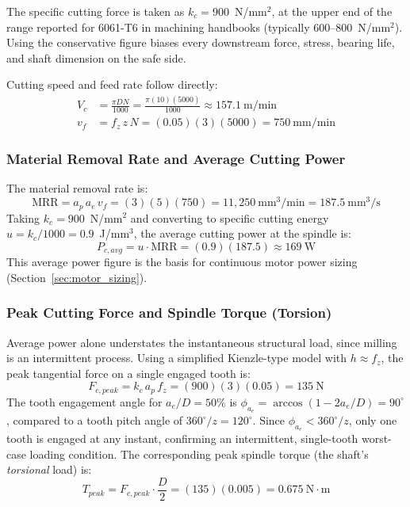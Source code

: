 \documentclass[12pt,a4paper]{report}
\begin{document}
	The specific cutting force is taken as $k_c = 900$~N/mm$^2$, at the upper end of the
	range reported for 6061-T6 in machining handbooks (typically 600--800~N/mm$^2$). Using
	the conservative figure biases every downstream force, stress, bearing life, and shaft
	dimension on the safe side.
	
	Cutting speed and feed rate follow directly:
	\begin{align}
		V_c &= \frac{\pi D N}{1000} = \frac{\pi (10)(5000)}{1000} \approx 157.1~\text{m/min} \\
		v_f &= f_z \, z \, N = (0.05)(3)(5000) = 750~\text{mm/min}
	\end{align}
	
	\subsubsection{Material Removal Rate and Average Cutting Power}\label{sec:mrr_power}
	The material removal rate is:
	\begin{equation}
		\text{MRR} = a_p \, a_e \, v_f = (3)(5)(750) = 11{,}250~\text{mm}^3\text{/min} = 187.5~\text{mm}^3\text{/s}
	\end{equation}
	Taking $k_c = 900$~N/mm$^2$ and converting to specific cutting energy
	$u = k_c / 1000 = 0.9$~J/mm$^3$, the average cutting power at the spindle is:
	\begin{equation}
		P_{c,avg} = u \cdot \text{MRR} = (0.9)(187.5) \approx 169~\text{W}
	\end{equation}
	This average power figure is the basis for continuous motor power sizing (Section~\ref{sec:motor_sizing}).
	
	\subsubsection{Peak Cutting Force and Spindle Torque (Torsion)}\label{sec:peak_force_torque}
	Average power alone understates the instantaneous structural load, since milling is an
	intermittent process. Using a simplified Kienzle-type model with $h \approx f_z$, the peak
	tangential force on a single engaged tooth is:
	\begin{equation}
		F_{c,peak} = k_c \, a_p \, f_z = (900)(3)(0.05) = 135~\text{N}
	\end{equation}
	The tooth engagement angle for $a_e/D = 50\%$ is $\phi_{a_e} = \arccos(1 - 2a_e/D) = 90^\circ$,
	compared to a tooth pitch angle of $360^\circ/z = 120^\circ$. Since $\phi_{a_e} < 360^\circ/z$,
	only one tooth is engaged at any instant, confirming an intermittent, single-tooth worst-case
	loading condition. The corresponding peak spindle torque (the shaft's \emph{torsional} load)
	is:
	\begin{equation}
		T_{peak} = F_{c,peak} \cdot \frac{D}{2} = (135)(0.005) = 0.675~\text{N}\cdot\text{m}
	\end{equation}
	
\end{document}
